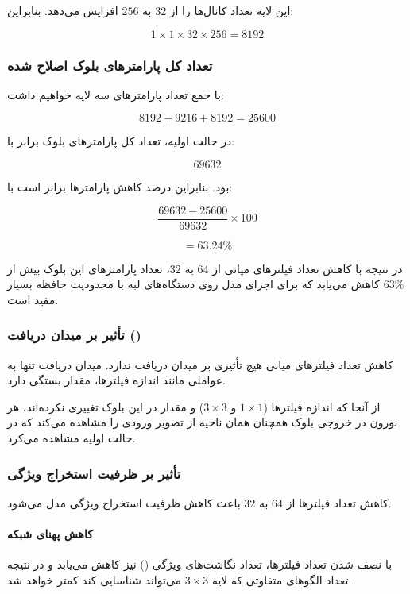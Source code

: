 \documentclass{article}
\begin{document}
این لایه تعداد کانال‌ها را از \(32\) به \(256\) افزایش می‌دهد. بنابراین:

\[
1 \times 1 \times 32 \times 256 = 8192
\]

\subsubsection{تعداد کل پارامترهای بلوک اصلاح شده}

با جمع تعداد پارامترهای سه لایه خواهیم داشت:

\[
8192 + 9216 + 8192 = 25600
\]

در حالت اولیه، تعداد کل پارامترهای بلوک برابر با:

\[
69632
\]

بود. بنابراین درصد کاهش پارامترها برابر است با:

\[
\frac{69632 - 25600}{69632} \times 100
\]

\[
= 63.24\%
\]

در نتیجه با کاهش تعداد فیلترهای میانی از \(64\) به \(32\)، تعداد پارامترهای این بلوک بیش از \(63\%\) کاهش می‌یابد که برای اجرای مدل روی دستگاه‌های لبه با محدودیت حافظه بسیار مفید است.

\subsubsection{تأثیر بر میدان دریافت ()}

کاهش تعداد فیلترهای میانی هیچ تأثیری بر میدان دریافت ندارد. میدان دریافت تنها به عواملی مانند اندازه فیلترها، مقدار  بستگی دارد.

از آنجا که اندازه فیلترها (\(1\times1\) و \(3\times3\)) و مقدار  در این بلوک تغییری نکرده‌اند، هر نورون در خروجی بلوک همچنان همان ناحیه از تصویر ورودی را مشاهده می‌کند که در حالت اولیه مشاهده می‌کرد.

\subsubsection{تأثیر بر ظرفیت استخراج ویژگی}

کاهش تعداد فیلترها از \(64\) به \(32\) باعث کاهش ظرفیت استخراج ویژگی مدل می‌شود.

\paragraph{کاهش پهنای شبکه}

با نصف شدن تعداد فیلترها، تعداد نگاشت‌های ویژگی () نیز کاهش می‌یابد و در نتیجه تعداد الگوهای متفاوتی که لایه \(3\times3\) می‌تواند شناسایی کند کمتر خواهد شد.
\end{document}
